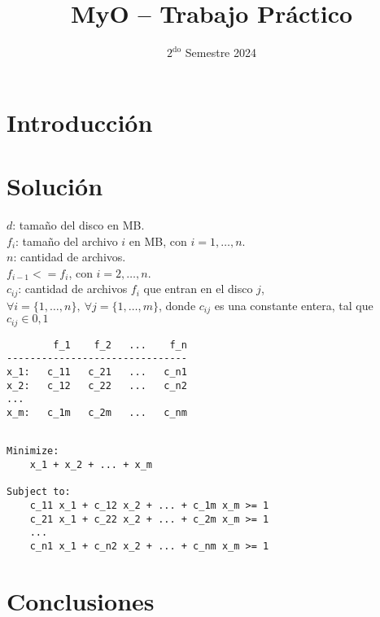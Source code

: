 \documentclass[11pt, a4paper, pdftex]{article}
\title{
	\huge MyO -- Trabajo Práctico\\
}
\author{
	\Xime \and \Mati \and \Lucifer \and \Lu
}
\date{\small $\text{2}^{\text{do}}$ Semestre 2024
}
\begin{document}
\renewcommand{\contentsname}{Contenidos}
\renewcommand{\listfigurename}{Listado de Figuras}
\renewcommand{\listtablename}{Listado de Tablas}
\renewcommand{\tablename}{Tabla}

\maketitle

\section*{Introducción}

\section*{Solución}

$d$: tamaño del disco en MB. \\ 

$f_{i}$: tamaño del archivo $i$ en MB, con $i = 1, \ldots, n$. \\

$n$: cantidad de archivos. \\

$f_{i-1} <= f_{i}$, con $i = 2, \ldots, n$. \\

$c_{ij}$: cantidad de archivos $f_{i}$ que entran en el disco $j$, $\forall i = \{1, \ldots, n\},\ \forall j = \{1, \ldots, m\}$, donde $c_{ij}$ es una constante entera, tal que $c_{ij} \in {0, 1}$\\

\begin{verbatim}
        f_1    f_2   ...    f_n
-------------------------------
x_1:   c_11   c_21   ...   c_n1
x_2:   c_12   c_22   ...   c_n2
...
x_m:   c_1m   c_2m   ...   c_nm
\end{verbatim}

\begin{verbatim}

Minimize:
	x_1 + x_2 + ... + x_m

Subject to:
	c_11 x_1 + c_12 x_2 + ... + c_1m x_m >= 1
	c_21 x_1 + c_22 x_2 + ... + c_2m x_m >= 1
	...
	c_n1 x_1 + c_n2 x_2 + ... + c_nm x_m >= 1
\end{verbatim}

\section*{Conclusiones}
\end{document}
